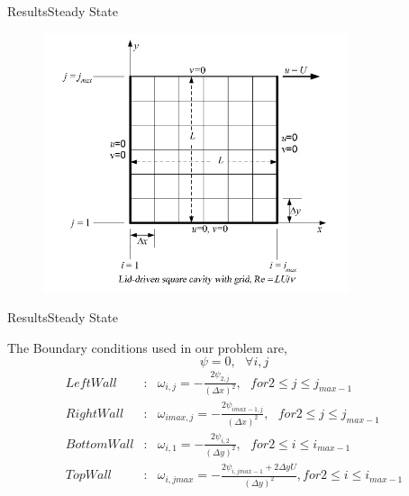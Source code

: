\documentclass[11pt]{beamer}
\begin{document}
\begin{frame}{Results}{Steady State}
\begin{figure}
\includegraphics[width=0.8\textwidth]{images/steady/domain}
\end{figure}
\end{frame}

\begin{frame}{Results}{Steady State}

The Boundary conditions used in our problem are,
$$\psi=0, ~~~\forall i,j$$
\begin{eqnarray}
Left Wall &:& \omega_{i,j} = - \frac{2 \psi_{2,j}}{(\Delta x)^{2}} , ~~~for 2\leq j \leq j_{max-1} \nonumber\\
Right Wall &:& \omega_{imax,j} = - \frac{2 \psi_{imax-1,j}}{(\Delta x)^{2}} , ~~~for 2\leq j \leq j_{max-1} \nonumber\\
Bottom Wall &:& \omega_{i,1} = - \frac{2 \psi_{i,2}}{(\Delta y)^{2}} , ~~~for 2\leq i \leq i_{max-1} \nonumber\\
Top Wall &:& \omega_{i,jmax} = - \frac{2 \psi_{i,jmax-1} + 2\Delta y U}{(\Delta y)^{2}} , for 2\leq i \leq i_{max-1} \nonumber
\end{eqnarray}
\end{frame}
\end{document}
